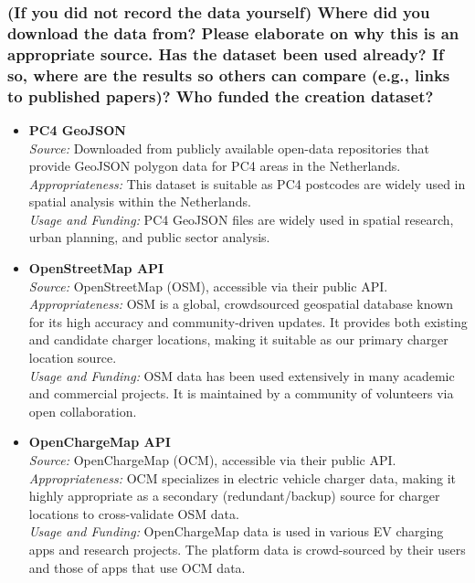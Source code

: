 \documentclass{article}
\newcommand{\question}[1]{#1}
\begin{document}
\question{\subsubsection*{(If you did not record the data yourself) Where did you download the data from? Please elaborate on why this is an appropriate source.    Has the dataset been used already? If so, where are the results so others can compare
		(e.g., links to published papers)? Who funded the creation dataset?}}
\begin{itemize}
	\item \textbf{PC4 GeoJSON} \\
	      \textit{Source:} Downloaded from publicly available open-data repositories that provide GeoJSON polygon data for PC4 areas in the Netherlands. \\
	      \textit{Appropriateness:} This dataset is suitable as PC4 postcodes are widely used in spatial analysis within the Netherlands. \\
	      \textit{Usage and Funding:} PC4 GeoJSON files are widely used in spatial research, urban planning, and public sector analysis.

	\item \textbf{OpenStreetMap API} \\
	      \textit{Source:} OpenStreetMap (OSM), accessible via their public API. \\
	      \textit{Appropriateness:} OSM is a global, crowdsourced geospatial database known for its high accuracy and community-driven updates. It provides both existing and candidate charger locations, making it suitable as our primary charger location source. \\
	      \textit{Usage and Funding:} OSM data has been used extensively in many academic and commercial projects. It is maintained by a community of volunteers via open collaboration.

	\item \textbf{OpenChargeMap API} \\
	      \textit{Source:} OpenChargeMap (OCM), accessible via their public API. \\
	      \textit{Appropriateness:} OCM specializes in electric vehicle charger data, making it highly appropriate as a secondary (redundant/backup) source for charger locations to cross-validate OSM data. \\
	      \textit{Usage and Funding:} OpenChargeMap data is used in various EV charging apps and research projects. The platform data is crowd-sourced by their users and those of apps that use OCM data.


\end{itemize}
\end{document}
